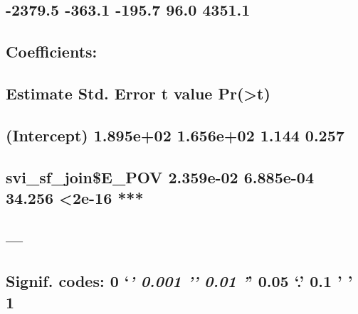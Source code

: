 \documentclass[
  12pt,
]{article}
\begin{document}
\hypertarget{section-86}{%
\subsection{-2379.5 -363.1 -195.7 96.0 4351.1}\label{section-86}}

\hypertarget{section-87}{%
\subsection{}\label{section-87}}

\hypertarget{coefficients-8}{%
\subsection{Coefficients:}\label{coefficients-8}}

\hypertarget{estimate-std.-error-t-value-prt-8}{%
\subsection{Estimate Std. Error t value
Pr(\textgreater\textbar t\textbar)}\label{estimate-std.-error-t-value-prt-8}}

\hypertarget{intercept-1.895e02-1.656e02-1.144-0.257}{%
\subsection{(Intercept) 1.895e+02 1.656e+02 1.144
0.257}\label{intercept-1.895e02-1.656e02-1.144-0.257}}

\hypertarget{svi_sf_joine_pov-2.359e-02-6.885e-04-34.256-2e-16}{%
\subsection{svi\_sf\_join\$E\_POV 2.359e-02 6.885e-04 34.256
\textless2e-16
***}\label{svi_sf_joine_pov-2.359e-02-6.885e-04-34.256-2e-16}}

\hypertarget{section-88}{%
\subsection{---}\label{section-88}}

\hypertarget{signif.-codes-0-0.001-0.01-0.05-.-0.1-1-8}{%
\subsection{\texorpdfstring{Signif. codes: 0 `\emph{\textbf{' 0.001 '}'
0.01 '}' 0.05 `.' 0.1 ' '
1}{Signif. codes: 0 `\,' 0.001 '\,' 0.01 '\,' 0.05 `.' 0.1 ' ' 1}}\label{signif.-codes-0-0.001-0.01-0.05-.-0.1-1-8}}
\end{document}
